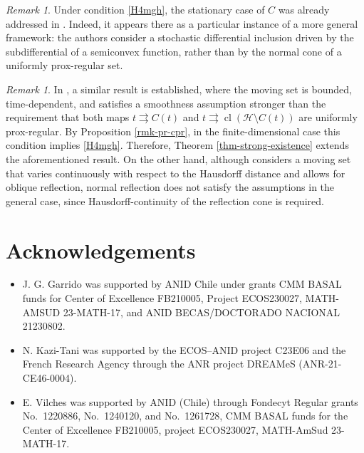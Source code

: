 \documentclass[preprint,12pt]{elsarticle}
\renewcommand{\H}{\mathcal{H}}
\newcommand{\tto}{\rightrightarrows}
\newcommand{\cl}{{\operatorname{cl}}}
\theoremstyle{plain}
\theoremstyle{definition}
\theoremstyle{remark}
\newtheorem{remark}[theorem]{Remark}
\begin{document}
\begin{remark}
    Under condition \ref{H4mgh}, the stationary case of $C$ was already addressed in \cite[Theorem 41]{Buckdahn2015}. Indeed, it appears there as a particular instance of a more general framework: the authors consider a stochastic differential inclusion driven by the subdifferential of a semiconvex function, rather than by the normal cone of a uniformly prox-regular set.
\end{remark}
    
    \begin{remark}
        In \cite[Theorem 3.2 \& Corollary 3.3] {Costantini2006Boundary}, a similar result is established, where the moving set is bounded, time-dependent, and satisfies a smoothness assumption stronger than the requirement that both maps $t\tto C(t)$ and $t\tto\cl(\H\setminus C(t))$ are uniformly prox-regular. By Proposition \ref{rmk-pr-cpr}, in the finite-dimensional case this condition implies \ref{H4mgh}. Therefore, Theorem \ref{thm-strong-existence} extends the aforementioned result. On the other hand, although \cite{MR2683628} considers a moving set that varies continuously with respect to the Hausdorff distance and allows for oblique reflection, normal reflection does not satisfy the assumptions in the general case, since Hausdorff-continuity of the reflection cone is required.
    \end{remark}
    
    \section*{Acknowledgements}

    \begin{itemize}
        \item J. G. Garrido was supported by ANID Chile under grants CMM BASAL funds for Center of Excellence FB210005, Project ECOS230027, MATH-AMSUD 23-MATH-17, and ANID BECAS/DOCTORADO NACIONAL 21230802.
        \item N. Kazi-Tani was supported by the ECOS–ANID project C23E06 and the French Research Agency through the ANR project DREAMeS (ANR-21-CE46-0004).
        \item E. Vilches was supported by ANID (Chile) through Fondecyt Regular grants No.~1220886, No.~1240120, and No.~1261728, CMM BASAL funds for the Center of Excellence FB210005, project ECOS230027, MATH-AmSud 23-MATH-17.
    \end{itemize}

    
    
\end{document}
